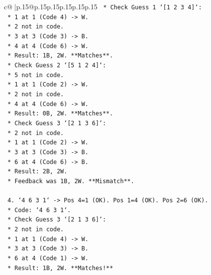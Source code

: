 \documentclass{article}
\begin{document}
{\begin{supertabular}{c@{$\;$}|p{.15\linewidth}@{}p{.15\linewidth}p{.15\linewidth}p{.15\linewidth}p{.15\linewidth}p{.15\linewidth}}
{{{\texttt{            *   Check Guess 1 `{[}1 2 3 4{]}`:} \\
\texttt{                *   1 at 1 (Code 4) {-}> W.} \\
\texttt{                *   2 not in code.} \\
\texttt{                *   3 at 3 (Code 3) {-}> B.} \\
\texttt{                *   4 at 4 (Code 6) {-}> W.} \\
\texttt{                *   Result: 1B, 2W. **Matches**.} \\
\texttt{            *   Check Guess 2 `{[}5 1 2 4{]}`:} \\
\texttt{                *   5 not in code.} \\
\texttt{                *   1 at 1 (Code 2) {-}> W.} \\
\texttt{                *   2 not in code.} \\
\texttt{                *   4 at 4 (Code 6) {-}> W.} \\
\texttt{                *   Result: 0B, 2W. **Matches**.} \\
\texttt{            *   Check Guess 3 `{[}2 1 3 6{]}`:} \\
\texttt{                *   2 not in code.} \\
\texttt{                *   1 at 1 (Code 2) {-}> W.} \\
\texttt{                *   3 at 3 (Code 3) {-}> B.} \\
\texttt{                *   6 at 4 (Code 6) {-}> B.} \\
\texttt{                *   Result: 2B, 2W.} \\
\texttt{                *   Feedback was 1B, 2W. **Mismatch**.} \\
\\ 
\texttt{        4.  `4 6 3 1` {-}> Pos 4=1 (OK). Pos 1=4 (OK). Pos 2=6 (OK).} \\
\texttt{            *   Code: `4 6 3 1`.} \\
\texttt{            *   Check Guess 3 `{[}2 1 3 6{]}`:} \\
\texttt{                *   2 not in code.} \\
\texttt{                *   1 at 1 (Code 4) {-}> W.} \\
\texttt{                *   3 at 3 (Code 3) {-}> B.} \\
\texttt{                *   6 at 4 (Code 1) {-}> W.} \\
\texttt{                *   Result: 1B, 2W. **Matches!**} \\
}}}
\end{supertabular}}
\end{document}
